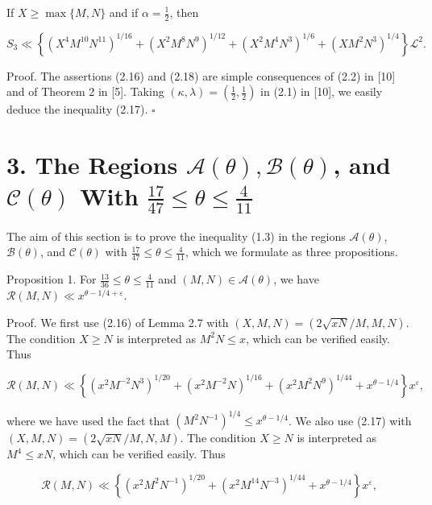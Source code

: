 \documentclass[10pt]{article}
\begin{document}
If $X \geqslant \max \{M, N\}$ and if $\alpha=\frac{1}{2}$, then


\begin{equation*}
S_{3} \ll\left\{\left(X^{4} M^{10} N^{11}\right)^{1 / 16}+\left(X^{2} M^{8} N^{9}\right)^{1 / 12}+\left(X^{2} M^{4} N^{3}\right)^{1 / 6}+\left(X M^{2} N^{3}\right)^{1 / 4}\right\} \mathscr{L}^{2} . \tag{2.18}
\end{equation*}


Proof. The assertions (2.16) and (2.18) are simple consequences of (2.2) in [10] and of Theorem 2 in [5]. Taking $(\kappa, \lambda)=\left(\frac{1}{2}, \frac{1}{2}\right)$ in (2.1) in [10], we easily deduce the inequality (2.17). \(\square\)

\section*{3. The Regions $\mathscr{A}(\theta), \mathscr{B}(\theta)$, and $\mathscr{C}(\theta)$ With $\frac{17}{47} \leqslant \theta \leqslant \frac{4}{11}$}
The aim of this section is to prove the inequality (1.3) in the regions $\mathscr{A}(\theta)$, $\mathscr{B}(\theta)$, and $\mathscr{C}(\theta)$ with $\frac{17}{47} \leqslant \theta \leqslant \frac{4}{11}$, which we formulate as three propositions.

Proposition 1. For $\frac{13}{36} \leqslant \theta \leqslant \frac{4}{11}$ and $(M, N) \in \mathscr{A}(\theta)$, we have $\mathscr{R}(M, N) \ll x^{\theta-1 / 4+\varepsilon}$.

Proof. We first use (2.16) of Lemma 2.7 with $(X, M, N)=(2 \sqrt{x N} / M, M, N)$. The condition $X \geqslant N$ is interpreted as $M^{2} N \leqslant x$, which can be verified easily. Thus


\begin{equation*}
\mathscr{R}(M, N) \ll\left\{\left(x^{2} M^{-2} N^{3}\right)^{1 / 20}+\left(x^{2} M^{-2} N\right)^{1 / 16}+\left(x^{2} M^{2} N^{9}\right)^{1 / 44}+x^{\theta-1 / 4}\right\} x^{\varepsilon}, \tag{3.1}
\end{equation*}


where we have used the fact that $\left(M^{2} N^{-1}\right)^{1 / 4} \leqslant x^{\theta-1 / 4}$.
We also use (2.17) with $(X, M, N)=(2 \sqrt{x N} / M, N, M)$. The condition $X \geqslant N$ is interpreted as $M^{4} \leqslant x N$, which can be verified easily. Thus


\begin{equation*}
\mathscr{R}(M, N) \ll\left\{\left(x^{2} M^{2} N^{-1}\right)^{1 / 20}+\left(x^{2} M^{14} N^{-3}\right)^{1 / 44}+x^{\theta-1 / 4}\right\} x^{\varepsilon}, \tag{3.2}
\end{equation*}
\end{document}
